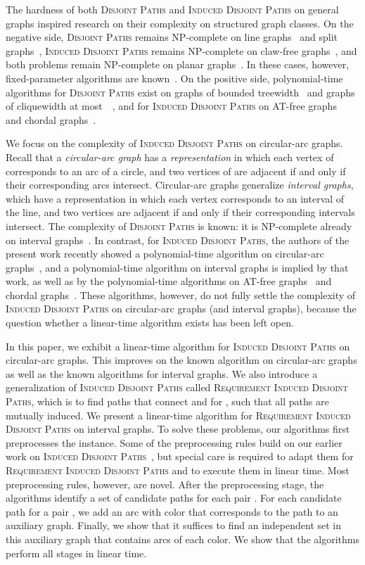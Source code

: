 \documentclass{llncs}
\newcommand{\NP}{{\sf NP}}
\newcommand{\problemIDP}{\textsc{Induced Disjoint Paths}}
\newcommand{\problemRIDP}{\textsc{Requirement Induced Disjoint Paths}}
\newcommand{\problemDP}{\textsc{Disjoint Paths}}
\begin{document}
The hardness of both \problemDP{} and \problemIDP{} on general graphs inspired research on their complexity on structured graph classes. On the negative side, \problemDP{} remains \NP-complete on line graphs~\cite{Ly75} and split graphs~\cite{HvtHSvL2014}, \problemIDP{} remains \NP-complete on claw-free graphs~\cite{FKLP12}, and both problems remain \NP-complete on planar graphs~\cite{KvL84,GPV12}. In these cases, however, fixed-parameter algorithms are known~\cite{GPV12b,HvtHSvL2014,KK12,RRSS93,RS95}. On the positive side, polynomial-time algorithms for \problemDP{} exist on graphs of bounded treewidth~\cite{Reed1997} and graphs of cliquewidth at most~~\cite{GurWan2006}, and for \problemIDP{} on AT-free graphs~\cite{GPV12} and chordal graphs~\cite{BGHHKP12}.

We focus on the complexity of \problemIDP{} on circular-arc graphs. Recall that a \emph{circular-arc graph}  has a \emph{representation} in which each vertex of  corresponds to an arc of a circle, and two vertices of  are adjacent if and only if their corresponding arcs intersect. Circular-arc graphs generalize \emph{interval graphs}, which have a representation in which each vertex corresponds to an interval of the line, and two vertices are adjacent if and only if their corresponding intervals intersect. The complexity of \problemDP{} is known: it is \NP-complete already on interval graphs~\cite{NS1996}. In contrast, for \problemIDP{}, the authors of the present work recently showed a polynomial-time algorithm on circular-arc graphs~\cite{GPV12b}, and a polynomial-time algorithm on interval graphs is implied by that work, as well as by the polynomial-time algorithms on AT-free graphs~\cite{GPV12} and chordal graphs~\cite{BGHHKP12}. These algorithms, however, do not fully settle the complexity of \problemIDP{} on circular-arc graphs (and interval graphs), because the question whether a linear-time algorithm exists has been left open.

In this paper, we exhibit a linear-time algorithm for \problemIDP{} on circular-arc graphs. This improves on the known algorithm on circular-arc graphs as well as the known algorithms for interval graphs. We also introduce a generalization of \problemIDP{} called \problemRIDP{}, which is to find  paths that connect  and  for , such that all paths are mutually induced. We present a linear-time algorithm for \problemRIDP{} on interval graphs. To solve these problems, our algorithms first preprocesses the instance. Some of the preprocessing rules build on our earlier work on \problemIDP{}~\cite{GPV12,GPV12b}, but special care is required to adapt them for \problemRIDP{} and to execute them in linear time. Most preprocessing rules, however, are novel. After the preprocessing stage, the algorithms identify a set of candidate paths for each pair . For each candidate path for a pair , we add an arc with color  that corresponds to the path to an auxiliary graph. Finally, we show that it suffices to find an independent set in this auxiliary graph that contains  arcs of each color. We show that the algorithms perform all stages in linear time.
\end{document}

